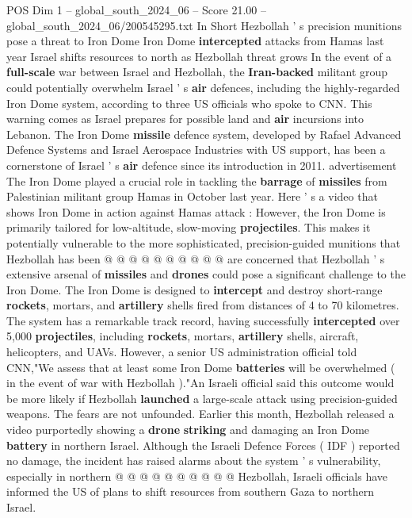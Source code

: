 \begin{textsample}{POS Dim 1 – global\_south\_2024\_06 – Score 21.00 – global\_south\_2024\_06/200545295.txt}  \label{ex:f1_pos_137}
In Short Hezbollah ' s precision munitions pose a threat to Iron Dome Iron Dome \textbf{intercepted} attacks from Hamas last year Israel shifts resources to north as Hezbollah threat grows In the event of a \textbf{full-scale} war between Israel and Hezbollah, the \textbf{Iran-backed} militant group could potentially overwhelm Israel ' s \textbf{air} defences, including the highly-regarded Iron Dome system, according to three US officials who spoke to CNN.
This warning comes as Israel prepares for possible land and \textbf{air} incursions into Lebanon.
The Iron Dome \textbf{missile} defence system, developed by Rafael Advanced Defence Systems and Israel Aerospace Industries with US support, has been a cornerstone of Israel ' s \textbf{air} defence since its introduction in 2011. advertisement The Iron Dome played a crucial role in tackling the \textbf{barrage} of \textbf{missiles} from Palestinian militant group Hamas in October last year.
Here ' s a video that shows Iron Dome in action against Hamas attack : However, the Iron Dome is primarily tailored for low-altitude, slow-moving \textbf{projectiles}.
This makes it potentially vulnerable to the more sophisticated, precision-guided munitions that Hezbollah has been @ @ @ @ @ @ @ @ @ @ are concerned that Hezbollah ' s extensive arsenal of \textbf{missiles} and \textbf{drones} could pose a significant challenge to the Iron Dome.
The Iron Dome is designed to \textbf{intercept} and destroy short-range \textbf{rockets}, mortars, and \textbf{artillery} shells fired from distances of 4 to 70 kilometres.
The system has a remarkable track record, having successfully \textbf{intercepted} over 5,000 \textbf{projectiles}, including \textbf{rockets}, mortars, \textbf{artillery} shells, aircraft, helicopters, and UAVs.
However, a senior US administration official told CNN,"We assess that at least some Iron Dome \textbf{batteries} will be overwhelmed ( in the event of war with Hezbollah )."An Israeli official said this outcome would be more likely if Hezbollah \textbf{launched} a large-scale attack using precision-guided weapons.
The fears are not unfounded.
Earlier this month, Hezbollah released a video purportedly showing a \textbf{drone} \textbf{striking} and damaging an Iron Dome \textbf{battery} in northern Israel.
Although the Israeli Defence Forces ( IDF ) reported no damage, the incident has raised alarms about the system ' s vulnerability, especially in northern @ @ @ @ @ @ @ @ @ @ Hezbollah, Israeli officials have informed the US of plans to shift resources from southern Gaza to northern Israel.

\end{textsample}
